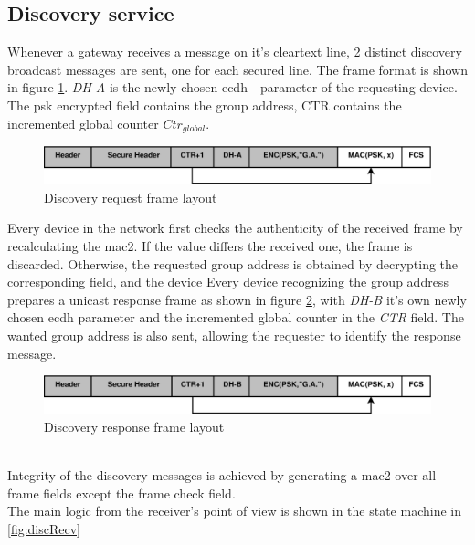 \subsection{Discovery service}
Whenever a gateway receives a message on it's cleartext line, 2 distinct discovery broadcast messages are sent, one for each secured line. 
The frame format is shown in 
figure \ref{fig:discReqFormat}. \textit{DH-A} is the newly chosen \gls{ecdh} - parameter of the requesting device.
The \gls{psk} encrypted field contains the group address, CTR contains the incremented global counter $Ctr_{global}$.
\begin{figure}
  \centering
    \includegraphics[width=1\textwidth]{figures/formatDiscReq.eps}
 \caption{Discovery request frame layout}
 \label{fig:discReqFormat}
\end{figure}
Every device in the network first checks the authenticity of the received frame by recalculating the \gls{mac2}. If the value differs the received one, the frame
is discarded. Otherwise, the requested group address is obtained by decrypting the corresponding field, and the device 
Every device recognizing the group address prepares a unicast response frame as shown in figure \ref{fig:discResFormat}, 
with \textit{DH-B} it's own newly chosen \gls{ecdh} parameter and the incremented global counter in the \textit{CTR} field. The wanted group address is also
sent, allowing the requester to identify the response message.
\begin{figure}
  \centering
    \includegraphics[width=1\textwidth]{figures/formatDiscResp.eps}
 \caption{Discovery response frame layout}
 \label{fig:discResFormat}
\end{figure}
\\
Integrity of the discovery messages is achieved by generating a \gls{mac2} over all frame fields except the frame check field.
\\
The main logic from the receiver's point of view is shown in the state machine in \ref{fig:discRecv}

